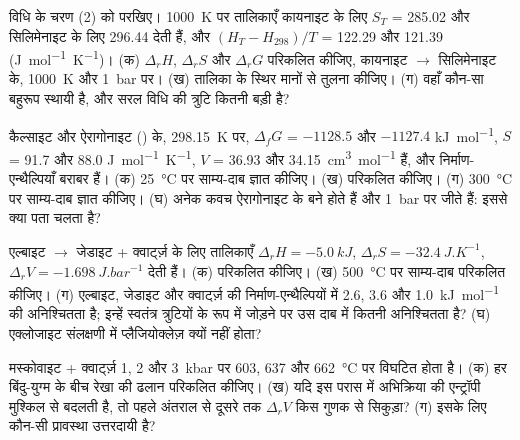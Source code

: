 \begin{exercise}[$\star\star$]\label{exo:b2:metamorphic-facies:6}
विधि के चरण (2) को परखिए। \qty{1000}{K} पर तालिकाएँ कायनाइट के लिए $S_T$ = 285.02
और सिलिमेनाइट के लिए 296.44 देती हैं, और $(H_T - H_{298})/T$ = 122.29 और 121.39
(\unit{J.mol^{-1}.K^{-1}})। (क) $\Delta_r H$, $\Delta_r S$ और $\Delta_r G$ परिकलित कीजिए,
कायनाइट $\to$ सिलिमेनाइट के, \qty{1000}{K} और \qty{1}{bar} पर। (ख) तालिका के स्थिर
मानों से तुलना कीजिए। (ग) वहाँ कौन-सा बहुरूप स्थायी है, और सरल विधि की
त्रुटि कितनी बड़ी है?
\end{exercise}

\begin{exercise}[$\star\star$]\label{exo:b2:metamorphic-facies:7}
कैल्साइट और ऐरागोनाइट () के, \qty{298.15}{K} पर, $\Delta_f G$ = $-1128.5$ और
$-1127.4$ \unit{kJ.mol^{-1}}, $S$ = 91.7 और 88.0 \unit{J.mol^{-1}.K^{-1}}, $V$ = 36.93
और \qty{34.15}{cm^3.mol^{-1}} हैं, और निर्माण-एन्थैल्पियाँ बराबर हैं। (क)
\qty{25}{\celsius} पर साम्य-दाब ज्ञात कीजिए। (ख)  परिकलित कीजिए। (ग)
\qty{300}{\celsius} पर साम्य-दाब ज्ञात कीजिए। (घ) अनेक कवच ऐरागोनाइट के बने होते हैं और
\qty{1}{bar} पर जीते हैं: इससे क्या पता चलता है?
\end{exercise}

\begin{exercise}[$\star\star$]\label{exo:b2:metamorphic-facies:8}
एल्बाइट $\to$ जेडाइट + क्वार्ट्ज़ के लिए तालिकाएँ $\Delta_r H = \qty{-5.0}{kJ}$,
$\Delta_r S = \qty{-32.4}{J.K^{-1}}$, $\Delta_r V = \qty{-1.698}{J.bar^{-1}}$ देती हैं। (क)
 परिकलित कीजिए। (ख) \qty{500}{\celsius} पर साम्य-दाब परिकलित कीजिए।
(ग) एल्बाइट, जेडाइट और क्वार्ट्ज़ की निर्माण-एन्थैल्पियों में 2.6, 3.6
और \qty{1.0}{kJ.mol^{-1}} की अनिश्चितता है; इन्हें स्वतंत्र त्रुटियों के रूप में जोड़ने पर उस
दाब में कितनी अनिश्चितता है? (घ) एक्लोजाइट संलक्षणी में प्लैजियोक्लेज़ क्यों नहीं होता?
\end{exercise}

\begin{exercise}[$\star\star$]\label{exo:b2:metamorphic-facies:9}
मस्कोवाइट + क्वार्ट्ज़ 1, 2 और
\qty{3}{kbar} पर 603, 637 और \qty{662}{\celsius} पर विघटित होता है। (क) हर बिंदु-युग्म के बीच रेखा की ढलान परिकलित कीजिए। (ख) यदि
इस परास में अभिक्रिया की एन्ट्रॉपी मुश्किल से बदलती है, तो पहले अंतराल से दूसरे तक $\Delta_r V$
किस गुणक से सिकुड़ा? (ग) इसके लिए कौन-सी प्रावस्था उत्तरदायी है?
\end{exercise}

